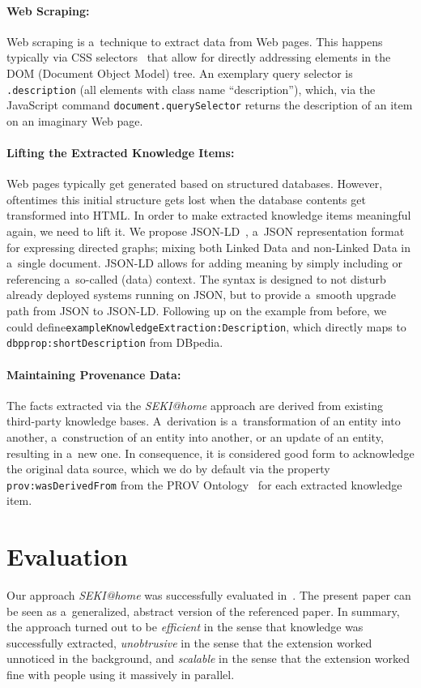 \documentclass[runningheads,a4paper]{llncs}
\begin{document}
\paragraph{Web Scraping:}
Web scraping is a~technique to extract data from Web pages.
This happens typically via CSS selectors~\cite{hunt2012}
that allow for directly addressing elements in the DOM (Document Object Model) tree.
An exemplary query selector is \texttt{.description}
(all elements with class name ``description''),
which, via the JavaScript command \texttt{document.querySelector}
returns the description of an item on an imaginary Web page.

\paragraph{Lifting the Extracted Knowledge Items:} \label{sec:lifting}
Web pages typically get generated based on structured databases.
However, oftentimes this initial structure gets lost
when the database contents get transformed into HTML.
In order to make extracted knowledge items meaningful again,
we need to lift it.
We propose JSON-LD~\cite{sporny2012}, a~JSON representation format
for expressing directed graphs;
mixing both Linked Data and non-Linked Data in a~single document.
JSON-LD allows for adding meaning
by simply including or referencing a~so-called (data) context.
The syntax is designed to not disturb already deployed systems running on JSON,
but to provide a~smooth upgrade path from JSON to JSON-LD.
Following up on the example from before, we could define\texttt{exampleKnowledgeExtraction:Description},
which directly maps to \texttt{dbpprop:shortDescription} from DBpedia.

\paragraph{Maintaining Provenance Data:}
The facts extracted via the \emph{SEKI@home} approach
are derived from existing third-party knowledge bases.
A~derivation is a~transformation of an entity into another,
a~construction of an entity into another, or an update of an entity,
resulting in a~new one.
In consequence, it is considered good form to acknowledge the original data source,
which we do by default via the property \texttt{prov:wasDerivedFrom}
from the PROV Ontology~\cite{lebo2012} for each extracted knowledge item.

\section{Evaluation} \label{sec:evaluation}
Our approach \emph{SEKI@home} was successfully evaluated in~\cite{Steiner2012SEKIatHome}.
The present paper can be seen as a~generalized, abstract version of the referenced paper.
In summary, the approach turned out to be
\emph{efficient} in the sense that knowledge was successfully extracted, \emph{unobtrusive} in the sense that the extension worked unnoticed in the background, and \emph{scalable} in the sense that the extension worked fine with people using it massively in parallel.
\end{document}
